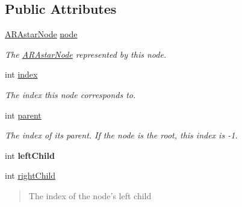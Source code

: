 \subsection*{Public Attributes}
\begin{DoxyCompactItemize}
\item 
\hypertarget{class_a_r_astar_heap_node_ac766db8d3cb63c58c56c73097ebb22d7}{\hyperlink{class_a_r_astar_node}{A\-R\-Astar\-Node} \hyperlink{class_a_r_astar_heap_node_ac766db8d3cb63c58c56c73097ebb22d7}{node}}\label{class_a_r_astar_heap_node_ac766db8d3cb63c58c56c73097ebb22d7}

\begin{DoxyCompactList}\small\item\em The \hyperlink{class_a_r_astar_node}{A\-R\-Astar\-Node} represented by this node. \end{DoxyCompactList}\item 
\hypertarget{class_a_r_astar_heap_node_a3f8678a53e656f69e7aa5c5e2f35b59b}{int \hyperlink{class_a_r_astar_heap_node_a3f8678a53e656f69e7aa5c5e2f35b59b}{index}}\label{class_a_r_astar_heap_node_a3f8678a53e656f69e7aa5c5e2f35b59b}

\begin{DoxyCompactList}\small\item\em The index this node corresponds to. \end{DoxyCompactList}\item 
\hypertarget{class_a_r_astar_heap_node_ab461374341ff031553fe8cd724410bf3}{int \hyperlink{class_a_r_astar_heap_node_ab461374341ff031553fe8cd724410bf3}{parent}}\label{class_a_r_astar_heap_node_ab461374341ff031553fe8cd724410bf3}

\begin{DoxyCompactList}\small\item\em The index of its parent. If the node is the root, this index is -\/1. \end{DoxyCompactList}\item 
\hypertarget{class_a_r_astar_heap_node_a2dbbf8de61f62a3f548203fb5ad447b9}{int {\bfseries left\-Child}}\label{class_a_r_astar_heap_node_a2dbbf8de61f62a3f548203fb5ad447b9}

\item 
int \hyperlink{class_a_r_astar_heap_node_a4722e1999dd6b0d3402796c82be44a44}{right\-Child}
\begin{DoxyCompactList}\small\item\em \begin{quotation}
The index of the node's left child \end{quotation}
\end{DoxyCompactList}\end{DoxyCompactItemize}


